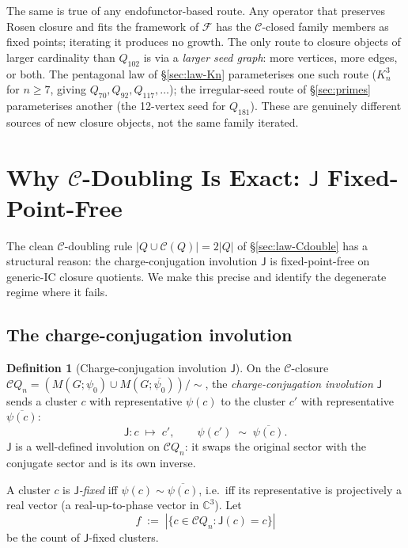 \documentclass[12pt,a4paper]{article}
\theoremstyle{definition}
\newtheorem{definition}[theorem]{Definition}
\theoremstyle{remark}
\newcommand{\bC}{\mathbb{C}}
\newcommand{\Kn}{K_n^3}
\newcommand{\Qn}{Q_n}
\newcommand{\Ccls}{\mathcal{C}}             %
\newcommand{\Fcls}{\mathcal{F}}             %
\newcommand{\Jconj}{\mathsf{J}}             %
\newcommand{\proj}{\mathrel{\sim}}          %
\begin{document}
The same is true of any endofunctor-based route. Any operator that
preserves Rosen closure and fits the framework of $\Fcls$ has the
$\Ccls$-closed family members as fixed points; iterating it produces
no growth. The only route to closure objects of larger cardinality
than $Q_{102}$ is via a \emph{larger seed graph}: more vertices, more
edges, or both. The pentagonal law of \S\ref{sec:law-Kn} parameterises
one such route ($\Kn$ for $n \ge 7$, giving $Q_{70}, Q_{92},
Q_{117}, \dots$); the irregular-seed route of \S\ref{sec:primes}
parameterises another (the 12-vertex seed for $Q_{181}$). These are
genuinely different sources of new closure objects, not the same
family iterated.

\section{Why $\Ccls$-Doubling Is Exact: $\Jconj$ Fixed-Point-Free}
\label{sec:j-fixed}

The clean $\Ccls$-doubling rule $|Q \cup \Ccls(Q)| = 2|Q|$ of
\S\ref{sec:law-Cdouble} has a structural reason: the
charge-conjugation involution $\Jconj$ is fixed-point-free on
generic-IC closure quotients. We make this precise and identify the
degenerate regime where it fails.

\subsection{The charge-conjugation involution}\label{sec:J-defn}

\begin{definition}[Charge-conjugation involution $\Jconj$]
\label{def:J}
On the $\Ccls$-closure $\Ccls\Qn = (M(G; \psi_0) \cup M(G;
\overline{\psi_0}))/{\sim}$, the \emph{charge-conjugation involution}
$\Jconj$ sends a cluster $c$ with representative $\psi(c)$ to the
cluster $c'$ with representative $\overline{\psi(c)}$:
\[
\Jconj : c \;\mapsto\; c', \qquad \psi(c') \;\proj\; \overline{\psi(c)}.
\]
$\Jconj$ is a well-defined involution on $\Ccls\Qn$: it swaps the
original sector with the conjugate sector and is its own inverse.
\end{definition}

A cluster $c$ is \emph{$\Jconj$-fixed} iff $\psi(c) \proj
\overline{\psi(c)}$, i.e.\ iff its representative is projectively a
real vector (a real-up-to-phase vector in $\bC^3$). Let
\[
f \;:=\; |\{c \in \Ccls\Qn : \Jconj(c) = c\}|
\]
be the count of $\Jconj$-fixed clusters.
\end{document}
